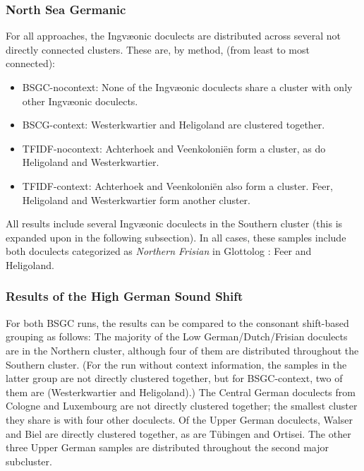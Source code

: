 \documentclass[a4paper]{article}
\begin{document}

\subsubsection{North Sea Germanic}

For all approaches, the Ingv\ae{}onic doculects
are distributed across several not directly connected clusters.
These are, by method, (from least to most connected):

\begin{itemize}
\item
BSGC-nocontext:
None of the Ingv\ae{}onic doculects share a cluster
with only other Ingv\ae{}onic doculects.

\item
BSCG-context:
Westerkwartier and Heligoland are clustered together.

\item
TFIDF-nocontext:
Achterhoek and Veenkoloni\"{e}n form a cluster,
as do Heligoland and Westerkwartier.

\item
TFIDF-context:
Achterhoek and Veenkoloni\"{e}n also form a cluster.
Feer, Heligoland and Westerkwartier form another cluster.
\end{itemize}

All results include several Ingv\ae{}onic doculects
in the Southern cluster
(this is expanded upon in the following subsection).
In all cases, these
samples include both doculects categorized as \textit{Northern Frisian}
in Glottolog \citep{hammarstroem2018glottolog}: Feer and Heligoland.


\subsubsection{Results of the High German Sound Shift}

For both BSGC runs, the results can be compared to the consonant shift-based grouping as follows:
The majority of the Low German/Dutch/Frisian doculects are in
the Northern cluster,
although four of them are distributed throughout the Southern cluster.
(For the run without context information,
the samples in the latter group are not directly clustered together,
but for BSGC-context,
two of them are (Westerkwartier and Heligoland).)
The Central German doculects from Cologne and Luxembourg
are not directly clustered together; the smallest cluster they share
is with four other doculects.
Of the Upper German doculects,
Walser and Biel are directly clustered together,
as are T\"{u}bingen and Ortisei.
The other three Upper German samples are distributed throughout
the second major subcluster.
\end{document}
